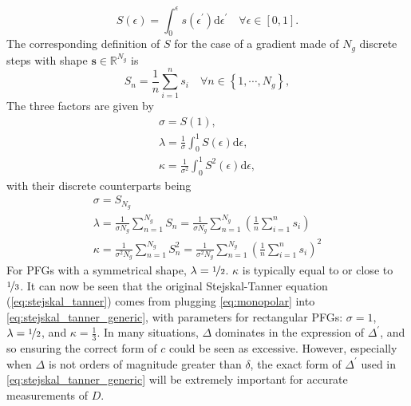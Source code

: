 \begin{equation}
    S(\epsilon) = \int_0^{\epsilon} s\left(\epsilon^{\prime}\right)
            \mathrm{d} \epsilon^{\prime} \quad \forall \epsilon \in [0, 1].
\end{equation}
The corresponding definition of $S$ for the case of a gradient made of $N_g$
discrete steps with shape $\symbf{s} \in \mathbb{R}^{N_g}$ is
\begin{equation}
    S_n =
        \frac{1}{n} \sum_{i = 1}^{n} s_i \quad
        \forall n \in \left\lbrace 1, \cdots, N_g\right\rbrace,
\end{equation}
The three factors are given by
\begin{subequations}
    \begin{gather}
        \sigma = S(1),\\
        \lambda = \frac{1}{\sigma} \int_0^1 S(\epsilon) \mathrm{d} \epsilon,\\
        \kappa = \frac{1}{\sigma^2} \int_0^1 S^2(\epsilon) \mathrm{d} \epsilon,
    \end{gather}
\end{subequations}
with their discrete counterparts being
\begin{subequations}
    \begin{gather}
        \sigma = S_{N_g} \\
        \lambda = \frac{1}{\sigma N_g} \sum_{n = 1}^{N_g} S_n
            = \frac{1}{\sigma N_g} \sum_{n=1}^{N_g}
            \left(\frac{1}{n} \sum_{i=1}^{n} s_i\right) \\
        \kappa = \frac{1}{\sigma^2 N_g} \sum_{n = 1}^{N_g} S^2_n
            = \frac{1}{\sigma^2 N_g} \sum_{n = 1}^{N_g}
            \left(\frac{1}{n} \sum_{i=1}^{n} s_i\right)^2
    \end{gather}
\end{subequations}
For \acp{PFG} with a symmetrical shape, $\lambda = \nicefrac{1}{2}$. $\kappa$
is typically equal to or close to $\nicefrac{1}{3}$. It can now be seen that
the original Stejskal-Tanner equation (\cref{eq:stejskal_tanner}) comes from
plugging \cref{eq:monopolar} into \cref{eq:stejskal_tanner_generic}, with
parameters for rectangular \acp{PFG}: $\sigma = 1$,  $\lambda =
\nicefrac{1}{2}$, and  $\kappa = \frac{1}{3}$. In many situations,  $\Delta$
dominates in the expression of $\Delta^{\prime}$, and so ensuring the correct
form of $c$ could be seen as excessive. However, especially when  $\Delta$ is
not orders of magnitude greater than $\delta$, the exact form of
$\Delta^{\prime}$ used in \cref{eq:stejskal_tanner_generic} will be
extremely important for accurate measurements of $D$.

